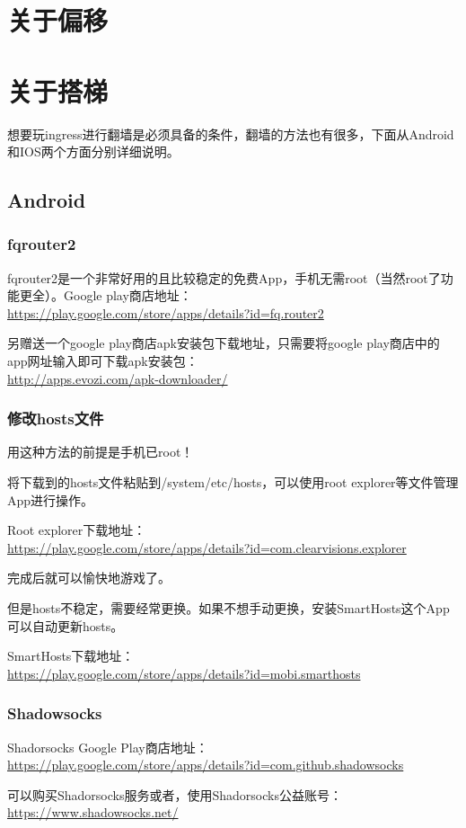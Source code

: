 \documentclass[a4paper]{article}
\begin{document}
\section{关于偏移}

\section{关于搭梯}
想要玩ingress进行翻墙是必须具备的条件，翻墙的方法也有很多，下面从Android和IOS两个方面分别详细说明。

\subsection{Android}
\subsubsection{fqrouter2}
fqrouter2是一个非常好用的且比较稳定的免费App，手机无需root（当然root了功能更全）。Google play商店地址：\\
\url{https://play.google.com/store/apps/details?id=fq.router2} \par
另赠送一个google play商店apk安装包下载地址，只需要将google play商店中的app网址输入即可下载apk安装包：\\
\url{http://apps.evozi.com/apk-downloader/}
\subsubsection{修改hosts文件}
用这种方法的前提是手机已root！\par
将下载到的hosts文件粘贴到/system/etc/hosts，可以使用root explorer等文件管理App进行操作。\par
Root explorer下载地址：\\
\url{https://play.google.com/store/apps/details?id=com.clearvisions.explorer}\par
完成后就可以愉快地游戏了。\par
但是hosts不稳定，需要经常更换。如果不想手动更换，安装SmartHosts这个App可以自动更新hosts。\par
SmartHosts下载地址：\\
\url{https://play.google.com/store/apps/details?id=mobi.smarthosts}

\subsubsection{Shadowsocks}
Shadorsocks Google Play商店地址：\\
\url{https://play.google.com/store/apps/details?id=com.github.shadowsocks}\par
可以购买Shadorsocks服务或者，使用Shadorsocks公益账号：\\
\url{https://www.shadowsocks.net/}
\end{document}
